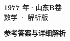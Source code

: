 \documentclass[zihao=-4, a4paper]{ctexart}
\begin{document}
\begin{center}
  {\Large\bfseries 1977 年·山东B卷}\\[4pt]
  {\large 数学 · 解析版}
\end{center}
\medskip
{}

\clearpage
{}
\begin{center}{\Large\bfseries 参考答案与详细解析}\end{center}
\medskip

\end{document}
